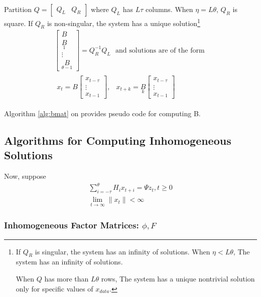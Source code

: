 \documentclass[12pt]{article}
\begin{document}
Partition $Q=
\begin{bmatrix}
  Q_L & Q_R
\end{bmatrix}$ where $Q_L$ has $L\tau$ columns.
When $\eta =L \theta$, $Q_R$ is square.
If  $Q_R$ is non-singular, the system has a unique solution\footnote{
  If $Q_R$ is singular, the system has an infinity of solutions.
  When $\eta <L \theta$,
The system has an infinity of solutions.

  When $Q$ has more than $L \theta$ rows,
The system has a unique nontrivial 
solution only for specific values of $x_{data}$.
}
\begin{gather}
    \begin{bmatrix}
    B \\\underset{1}{B}\\ \vdots \\ \underset{\theta-1}{B}  
  \end{bmatrix}
= Q_R^{-1} Q_L \,\,\text{ and solutions are of the form }\\
\begin{matrix}
x_t=B 
\begin{bmatrix}
  x_{t-\tau}\\
\vdots\\
  x_{t-1}
\end{bmatrix},&
x_{t+k}=\underset{k}{B} 
\begin{bmatrix}
  x_{t-\tau}\\
\vdots\\
  x_{t-1}
\end{bmatrix}
\end{matrix} 
\end{gather}

Algorithm \ref{alg:bmat} on \pageref{alg:bmat} provides pseudo code for computing B.

\subsection{Algorithms for Computing Inhomogeneous Solutions }
\label{inhomo}
Now, suppose
\begin{gather}\label{eq:inhomog}
\sum_{i= - \tau}^\theta{ H_i  x_{ t + i } }= \Psi{} z_{t}, t \geq0\\
\lim_{ t \rightarrow\infty} \|x_t\|   < \infty
\end{gather}





\subsubsection{Inhomogeneous Factor Matrices: $\phi, F$}
\label{sec:inhomofactor}
\label{sec:inhomog}
\end{document}
